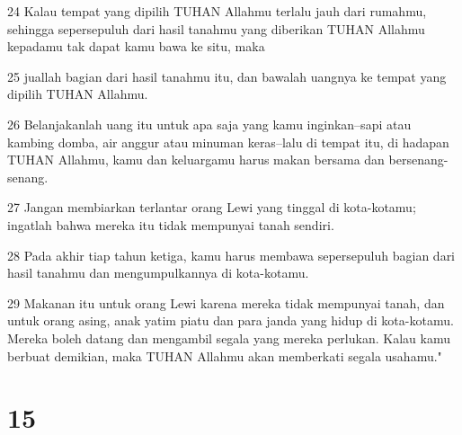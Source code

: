 \par 24 Kalau tempat yang dipilih TUHAN Allahmu terlalu jauh dari rumahmu, sehingga sepersepuluh dari hasil tanahmu yang diberikan TUHAN Allahmu kepadamu tak dapat kamu bawa ke situ, maka
\par 25 juallah bagian dari hasil tanahmu itu, dan bawalah uangnya ke tempat yang dipilih TUHAN Allahmu.
\par 26 Belanjakanlah uang itu untuk apa saja yang kamu inginkan--sapi atau kambing domba, air anggur atau minuman keras--lalu di tempat itu, di hadapan TUHAN Allahmu, kamu dan keluargamu harus makan bersama dan bersenang-senang.
\par 27 Jangan membiarkan terlantar orang Lewi yang tinggal di kota-kotamu; ingatlah bahwa mereka itu tidak mempunyai tanah sendiri.
\par 28 Pada akhir tiap tahun ketiga, kamu harus membawa sepersepuluh bagian dari hasil tanahmu dan mengumpulkannya di kota-kotamu.
\par 29 Makanan itu untuk orang Lewi karena mereka tidak mempunyai tanah, dan untuk orang asing, anak yatim piatu dan para janda yang hidup di kota-kotamu. Mereka boleh datang dan mengambil segala yang mereka perlukan. Kalau kamu berbuat demikian, maka TUHAN Allahmu akan memberkati segala usahamu."

\chapter{15}

